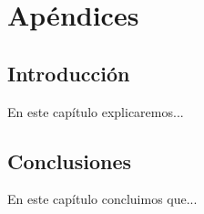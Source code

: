 \chapter{Apéndices}\label{cap:apendices}

\section{Introducción}
En este capítulo explicaremos...

\section{Conclusiones}
En este capítulo concluimos que...